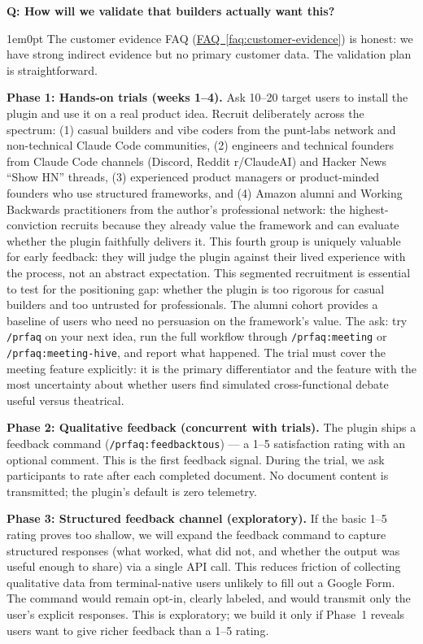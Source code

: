 \documentclass[11pt,letterpaper]{article}
\newcounter{faqnum}
\newenvironment{faqpair}[1]{%
  \needspace{4\baselineskip}%
  \vspace{0.5em}%
  \refstepcounter{faqnum}%
  \noindent\textbf{\color{SectionBlue}Q\thefaqnum: #1}\par\nopagebreak[4]%
  \vspace{0.2em}%
  \begin{adjustwidth}{1em}{0pt}%
  \setlength{\parindent}{0pt}%
}{%
  \end{adjustwidth}%
  \vspace{0.5em}%
}
\newcommand{\faqref}[1]{\hyperref[#1]{FAQ~\ref*{#1}}}
\begin{document}
\begin{faqpair}{How will we validate that builders actually want this?}\label{faq:validation}
  The customer evidence FAQ (\faqref{faq:customer-evidence}) is honest: we have strong indirect evidence but no primary customer data. The validation plan is straightforward.

  \textbf{Phase 1: Hands-on trials (weeks 1--4).} Ask 10--20 target users to install the plugin and use it on a real product idea. Recruit deliberately across the spectrum: (1) casual builders and vibe coders from the punt-labs network and non-technical Claude Code communities, (2) engineers and technical founders from Claude Code channels (Discord, Reddit r/ClaudeAI) and Hacker News ``Show HN'' threads, (3) experienced product managers or product-minded founders who use structured frameworks, and (4) Amazon alumni and Working Backwards practitioners from the author's professional network: the highest-conviction recruits because they already value the framework and can evaluate whether the plugin faithfully delivers it. This fourth group is uniquely valuable for early feedback: they will judge the plugin against their lived experience with the process, not an abstract expectation. This segmented recruitment is essential to test for the positioning gap: whether the plugin is too rigorous for casual builders and too untrusted for professionals. The alumni cohort provides a baseline of users who need no persuasion on the framework's value. The ask: try \texttt{/prfaq} on your next idea, run the full workflow through \texttt{/prfaq:meeting} or \texttt{/prfaq:meeting-hive}, and report what happened. The trial must cover the meeting feature explicitly: it is the primary differentiator and the feature with the most uncertainty about whether users find simulated cross-functional debate useful versus theatrical.

  \textbf{Phase 2: Qualitative feedback (concurrent with trials).} The plugin ships a feedback command (\texttt{/prfaq:feedback\discretionary{-}{}{-}to\discretionary{-}{}{-}us}) --- a 1--5 satisfaction rating with an optional comment. This is the first feedback signal. During the trial, we ask participants to rate after each completed document. No document content is transmitted; the plugin's default is zero telemetry.

  \textbf{Phase 3: Structured feedback channel (exploratory).} If the basic 1--5 rating proves too shallow, we will expand the feedback command to capture structured responses (what worked, what did not, and whether the output was useful enough to share) via a single API call. This reduces friction of collecting qualitative data from terminal-native users unlikely to fill out a Google Form. The command would remain opt-in, clearly labeled, and would transmit only the user's explicit responses. This is exploratory; we build it only if Phase~1 reveals users want to give richer feedback than a 1--5 rating.


\end{faqpair}
\end{document}
